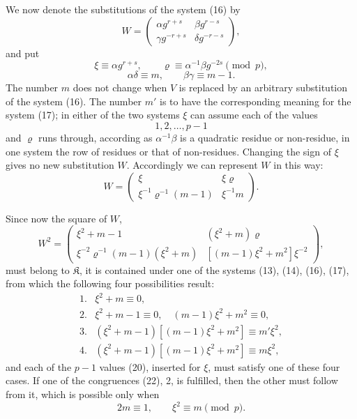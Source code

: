 \documentclass[11pt]{article}
\providecommand{\Kgrp}{\mathfrak K}
\begin{document}
We now denote the substitutions of the system (16) by
\[
 W=\begin{pmatrix}
 \alpha g^{r+s} & \beta g^{r-s}\\
 \gamma g^{-r+s} & \delta g^{-r-s}
 \end{pmatrix},
\]
and put
\begin{equation}
 \xi\equiv\alpha g^{r+s},\qquad \varrho\equiv\alpha^{-1}\beta g^{-2s}\pmod p,
\tag{18}
\end{equation}
\begin{equation}
 \alpha\delta\equiv m,\qquad \beta\gamma\equiv m-1.
\tag{19}
\end{equation}
The number $m$ does not change when $V$ is replaced by an arbitrary substitution of the system (16). The number $m'$ is to have the corresponding meaning for the system (17); in either of the two systems $\xi$ can assume each of the values
\begin{equation}
 1,2,\ldots,p-1
\tag{20}
\end{equation}
and $\varrho$ runs through, according as $\alpha^{-1}\beta$ is a quadratic residue or non-residue, in one system the row of residues or that of non-residues. Changing the sign of $\xi$ gives no new substitution $W$. Accordingly we can represent $W$ in this way:
\begin{equation}
 W=\begin{pmatrix}
 \xi & \xi\varrho\\
 \xi^{-1}\varrho^{-1}(m-1) & \xi^{-1}m
 \end{pmatrix}.
\tag{21}
\end{equation}

Since now the square of $W$,
\[
 W^2=\begin{pmatrix}
 \xi^2+m-1 & (\xi^2+m)\varrho\\
 \xi^{-2}\varrho^{-1}(m-1)(\xi^2+m) &
 [(m-1)\xi^2+m^2]\xi^{-2}
 \end{pmatrix},
\]
must belong to $\Kgrp$, it is contained under one of the systems (13), (14), (16), (17), from which the following four possibilities result:
\begin{equation}
\begin{array}{ll}
1.& \xi^2+m\equiv0,\\
2.& \xi^2+m-1\equiv0,\quad (m-1)\xi^2+m^2\equiv0,\\
3.& (\xi^2+m-1)[(m-1)\xi^2+m^2]\equiv m'\xi^2,\\
4.& (\xi^2+m-1)[(m-1)\xi^2+m^2]\equiv m\xi^2,
\end{array}
\tag{22}
\end{equation}
and each of the $p-1$ values (20), inserted for $\xi$, must satisfy one of these four cases. If one of the congruences (22), 2, is fulfilled, then the other must follow from it, which is possible only when
\begin{equation}
 2m\equiv1,\qquad \xi^2\equiv m\pmod p.
\tag{23}
\end{equation}
\end{document}
